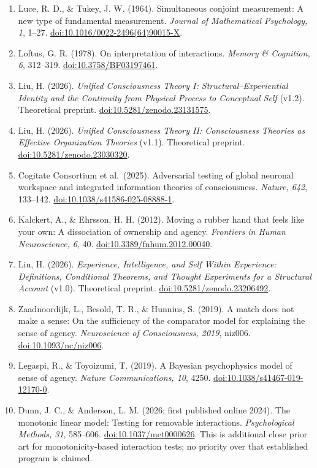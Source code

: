 \documentclass[
  11pt,
]{article}
\begin{document}
\begin{enumerate}
  \href{https://doi.org/10.1037/xhp0001154}{doi:10.1037/xhp0001154}.
\item
  Luce, R. D., \& Tukey, J. W. (1964). Simultaneous conjoint
  measurement: A new type of fundamental measurement. \emph{Journal of
  Mathematical Psychology, 1}, 1--27.
  \href{https://doi.org/10.1016/0022-2496(64)90015-X}{doi:10.1016/0022-2496(64)90015-X}.
\item
  Loftus, G. R. (1978). On interpretation of interactions. \emph{Memory
  \& Cognition, 6}, 312--319.
  \href{https://doi.org/10.3758/BF03197461}{doi:10.3758/BF03197461}.
\item
  Liu, H. (2026). \emph{Unified Consciousness Theory I:
  Structural--Experiential Identity and the Continuity from Physical
  Process to Conceptual Self} (v1.2). Theoretical preprint.
  \href{https://doi.org/10.5281/zenodo.23131575}{doi:10.5281/zenodo.23131575}.
\item
  Liu, H. (2026). \emph{Unified Consciousness Theory II: Consciousness
  Theories as Effective Organization Theories} (v1.1). Theoretical
  preprint.
  \href{https://doi.org/10.5281/zenodo.23030320}{doi:10.5281/zenodo.23030320}.
\item
  Cogitate Consortium et al.~(2025). Adversarial testing of global
  neuronal workspace and integrated information theories of
  consciousness. \emph{Nature, 642}, 133--142.
  \href{https://doi.org/10.1038/s41586-025-08888-1}{doi:10.1038/s41586-025-08888-1}.
\item
  Kalckert, A., \& Ehrsson, H. H. (2012). Moving a rubber hand that
  feels like your own: A dissociation of ownership and agency.
  \emph{Frontiers in Human Neuroscience, 6}, 40.
  \href{https://doi.org/10.3389/fnhum.2012.00040}{doi:10.3389/fnhum.2012.00040}.
\item
  Liu, H. (2026). \emph{Experience, Intelligence, and Self Within
  Experience: Definitions, Conditional Theorems, and Thought Experiments
  for a Structural Account} (v1.0). Theoretical preprint.
  \href{https://doi.org/10.5281/zenodo.23206492}{doi:10.5281/zenodo.23206492}.
\item
  Zaadnoordijk, L., Besold, T. R., \& Hunnius, S. (2019). A match does
  not make a sense: On the sufficiency of the comparator model for
  explaining the sense of agency. \emph{Neuroscience of Consciousness,
  2019}, niz006.
  \href{https://doi.org/10.1093/nc/niz006}{doi:10.1093/nc/niz006}.
\item
  Legaspi, R., \& Toyoizumi, T. (2019). A Bayesian psychophysics model
  of sense of agency. \emph{Nature Communications, 10}, 4250.
  \href{https://doi.org/10.1038/s41467-019-12170-0}{doi:10.1038/s41467-019-12170-0}.
\item
  Dunn, J. C., \& Anderson, L. M. (2026; first published online 2024).
  The monotonic linear model: Testing for removable interactions.
  \emph{Psychological Methods, 31}, 585--606.
  \href{https://doi.org/10.1037/met0000626}{doi:10.1037/met0000626}.
  This is additional close prior art for monotonicity-based interaction
  tests; no priority over that established program is claimed.
\end{enumerate}
\end{document}
